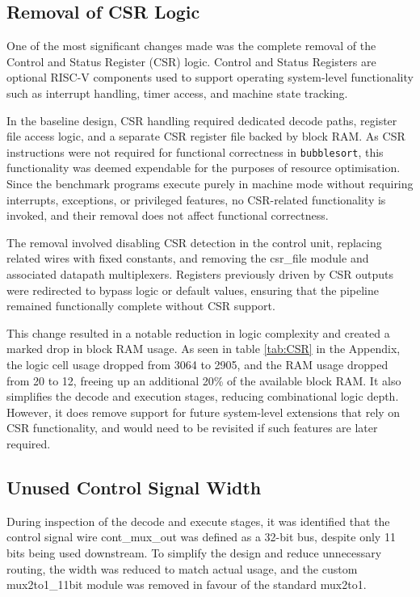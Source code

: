 \documentclass[a4paper,10pt]{article}
\begin{document}
\subsection{Removal of CSR Logic}
\label{sec:CSR}

One of the most significant changes made was the complete removal of the 
Control and Status Register (CSR) logic. 
Control and Status Registers are optional RISC-V components used to 
support operating system-level functionality such as 
interrupt handling, timer access, and machine state tracking.

In the baseline design, CSR handling required dedicated decode paths, 
register file access logic, and a separate CSR register file backed by block RAM. 
As CSR instructions were not required 
for functional correctness in \texttt{bubblesort}, 
this functionality was deemed expendable for the purposes of resource optimisation.
Since the benchmark programs execute purely in machine mode without 
requiring interrupts, exceptions, or privileged features, 
no CSR-related functionality is invoked, 
and their removal does not affect functional correctness.

The removal involved disabling CSR detection in the control unit, 
replacing related wires with fixed constants, and removing the csr\_file module 
and associated datapath multiplexers. 
Registers previously driven by CSR outputs were redirected to bypass logic 
or default values, ensuring that the pipeline remained functionally complete 
without CSR support.

This change resulted in a notable reduction in logic complexity and 
created a marked drop in block RAM usage. 
As seen in table \ref{tab:CSR} in the Appendix,
the logic cell usage dropped from 3064 to 2905, 
and the RAM usage dropped from 20 to 12,
freeing up an additional 20\% of the available block RAM.
It also simplifies the decode and 
execution stages, reducing combinational logic depth. 
However, it does remove support for future system-level extensions 
that rely on CSR functionality, and would need to be revisited if 
such features are later required.

\subsection{Unused Control Signal Width}
\label{sec:Signal_Width}

During inspection of the decode and execute stages, 
it was identified that the control signal wire cont\_mux\_out 
was defined as a 32-bit bus, despite only 11 bits being used downstream. 
To simplify the design and reduce unnecessary routing, 
the width was reduced to match actual usage, 
and the custom mux2to1\_11bit module was removed in favour of the standard mux2to1.
\end{document}
